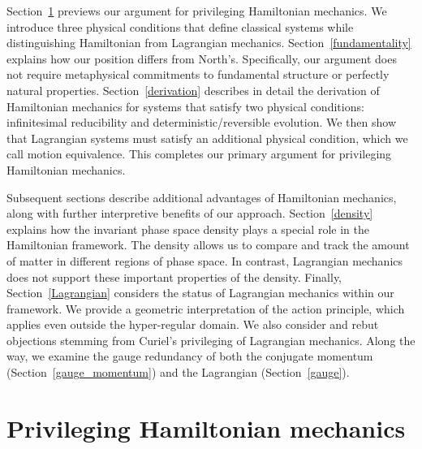 \documentclass[12pt, english, twoside]{article} %
\begin{document}
Section~\ref{privileging} previews our argument for privileging Hamiltonian mechanics. We introduce three physical conditions that define classical systems while distinguishing Hamiltonian from Lagrangian mechanics. Section~\ref{fundamentality} explains how our position differs from North's. Specifically, our argument does not require metaphysical commitments to fundamental structure or perfectly natural properties. Section~\ref{derivation} describes in detail the derivation of Hamiltonian mechanics for systems that satisfy two physical conditions: infinitesimal reducibility and deterministic/reversible evolution. We then show that Lagrangian systems must satisfy an additional physical condition, which we call motion equivalence. This completes our primary argument for privileging Hamiltonian mechanics.

Subsequent sections describe additional advantages of Hamiltonian mechanics, along with further interpretive benefits of our approach. Section~\ref{density} explains how the invariant phase space density plays a special role in the Hamiltonian framework. The density allows us to compare and track the amount of matter in different regions of phase space. In contrast, Lagrangian mechanics does not support these important properties of the density. Finally, Section~\ref{Lagrangian} considers the status of Lagrangian mechanics within our framework. We provide a geometric interpretation of the action principle, which applies even outside the hyper-regular domain. We also consider and rebut objections stemming from Curiel's \parencites*[]{Curiel} privileging of Lagrangian mechanics. Along the way, we examine the gauge redundancy of both the conjugate momentum (Section~\ref{gauge_momentum}) and the Lagrangian (Section~\ref{gauge}).



\section{Privileging Hamiltonian mechanics}
\label{privileging}
\end{document}
